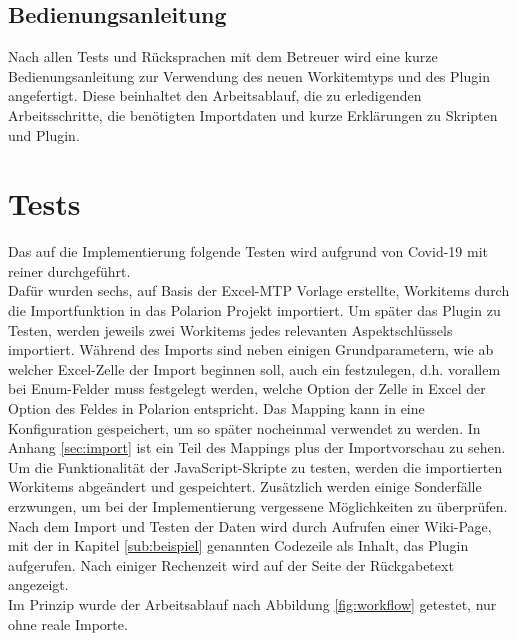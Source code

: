 \section{Bedienungsanleitung}
\label{sec:bedien}
Nach allen Tests und Rücksprachen mit dem Betreuer wird eine kurze Bedienungsanleitung zur Verwendung des neuen Workitemtyps und des Plugin angefertigt. Diese beinhaltet den Arbeitsablauf, die zu erledigenden Arbeitsschritte, die benötigten Importdaten und kurze Erklärungen zu Skripten und Plugin.
\chapter{Tests}
\label{cha:tests}
Das auf die Implementierung folgende Testen wird aufgrund von Covid-19 mit reiner  durchgeführt.\\
Dafür wurden sechs, auf Basis der Excel-MTP Vorlage erstellte, Workitems durch die Importfunktion in das Polarion Projekt importiert. Um später das Plugin zu Testen, werden jeweils zwei Workitems jedes relevanten Aspektschlüssels importiert. Während des Imports sind neben einigen Grundparametern, wie ab welcher Excel-Zelle der Import beginnen soll, auch ein  festzulegen, d.h. vorallem bei Enum-Felder muss festgelegt werden, welche Option der Zelle in Excel der Option des Feldes in Polarion entspricht. Das Mapping kann in eine Konfiguration gespeichert, um so später nocheinmal verwendet zu werden. In Anhang \ref{sec:import} ist ein Teil des Mappings plus der Importvorschau zu sehen.\\
Um die Funktionalität der JavaScript-Skripte zu testen, werden die importierten Workitems abgeändert und gespeichtert. Zusätzlich werden einige Sonderfälle erzwungen, um bei der Implementierung vergessene Möglichkeiten zu überprüfen.\\
Nach dem Import und Testen der Daten wird durch Aufrufen einer Wiki-Page, mit der in Kapitel \ref{sub:beispiel} genannten Codezeile als Inhalt, das Plugin aufgerufen. Nach einiger Rechenzeit wird auf der Seite der Rückgabetext angezeigt.\\ 
Im Prinzip wurde der Arbeitsablauf nach Abbildung \ref{fig:workflow} getestet, nur ohne reale Importe.
%
